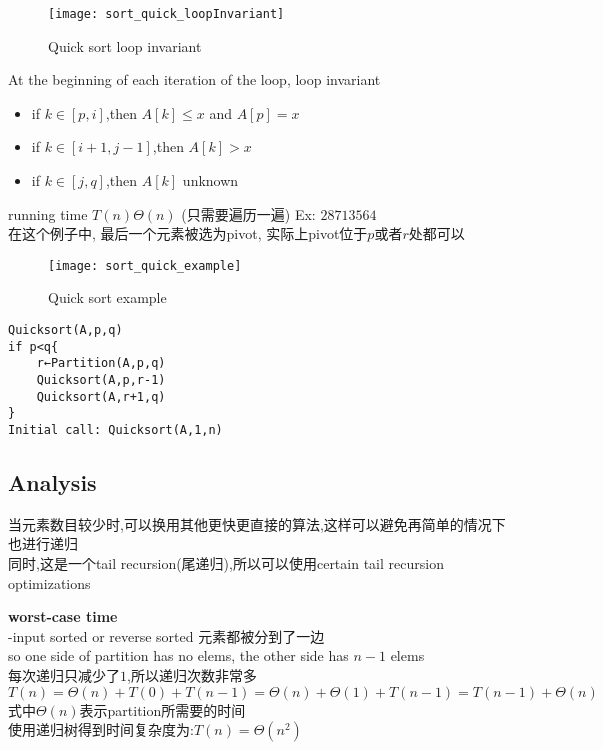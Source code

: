 \documentclass{article}
\begin{document}
\begin{figure}[htbp]
  \centering
  \texttt{[image: sort\_quick\_loopInvariant]}\\
  \caption{Quick sort loop invariant}\label{fig.sort.quick.loopInvariant}
\end{figure}
At the beginning of each iteration of the loop, loop invariant
\begin{itemize}
\item if $k \in [p,i]$,then $A[k] \leq x$ and $A[p]=x$
\item if $k \in [i+1,j-1]$,then $A[k] >x$
\item if $k \in [j,q]$,then $A[k]$ unknown
\end{itemize}

running time  $T(n)\Theta(n)$  (只需要遍历一遍)
Ex: $2 8 7 1 3 5 6 4$\\
在这个例子中, 最后一个元素被选为pivot, 实际上pivot位于$p$或者$r$处都可以
\begin{figure}[htbp]
  \centering
  \texttt{[image: sort\_quick\_example]}\\
  \caption{Quick sort example}\label{fig.sort.quick.example}
\end{figure}

\begin{verbatim}
Quicksort(A,p,q)
if p<q{
	r←Partition(A,p,q)
	Quicksort(A,p,r-1)
	Quicksort(A,r+1,q)
}
Initial call: Quicksort(A,1,n)
\end{verbatim}

\subsection{Analysis}
当元素数目较少时,可以换用其他更快更直接的算法,这样可以避免再简单的情况下也进行递归\\
同时,这是一个tail recursion(尾递归),所以可以使用certain tail recursion optimizations

\textbf{worst-case time}\\
-input sorted or reverse sorted 元素都被分到了一边\\
so one side of partition has no elems, the other side has $n-1$ elems\\
每次递归只减少了$1$,所以递归次数非常多\\
$T(n)
= \Theta(n)+T(0)+T(n-1)
= \Theta(n) + \Theta(1)+T(n-1)
=T(n-1) + \Theta(n)$\\
式中$\Theta(n)$表示partition所需要的时间\\
使用递归树得到时间复杂度为:$T(n)=\Theta(n^2)$
\end{document}
